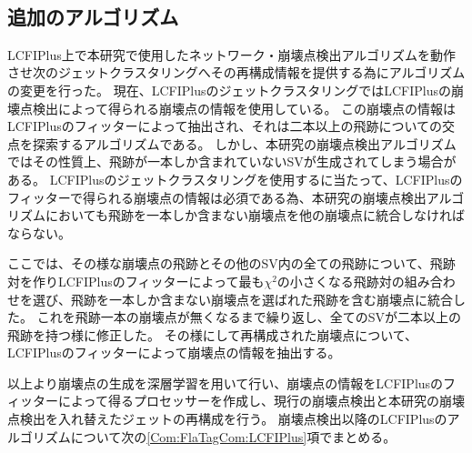 \begin{table}[htb]
 \centering
　\small
  \caption{崩壊点検出のソフトウェア動作環境}
  \label{SoftwareEnvironments}
\end{table}


\subsection{追加のアルゴリズム} \label{Com:FlaTagCom:SingleTrackMerge}

LCFIPlus上で本研究で使用したネットワーク・崩壊点検出アルゴリズムを動作させ次のジェットクラスタリングへその再構成情報を提供する為にアルゴリズムの変更を行った。
現在、LCFIPlusのジェットクラスタリングではLCFIPlusの崩壊点検出によって得られる崩壊点の情報を使用している。
この崩壊点の情報はLCFIPlusのフィッターによって抽出され、それは二本以上の飛跡についての交点を探索するアルゴリズムである。
しかし、本研究の崩壊点検出アルゴリズムではその性質上、飛跡が一本しか含まれていないSVが生成されてしまう場合がある。
LCFIPlusのジェットクラスタリングを使用するに当たって、LCFIPlusのフィッターで得られる崩壊点の情報は必須である為、本研究の崩壊点検出アルゴリズムにおいても飛跡を一本しか含まない崩壊点を他の崩壊点に統合しなければならない。

ここでは、その様な崩壊点の飛跡とその他のSV内の全ての飛跡について、飛跡対を作りLCFIPlusのフィッターによって最も$\chi^2$の小さくなる飛跡対の組み合わせを選び、飛跡を一本しか含まない崩壊点を選ばれた飛跡を含む崩壊点に統合した。
これを飛跡一本の崩壊点が無くなるまで繰り返し、全てのSVが二本以上の飛跡を持つ様に修正した。
その様にして再構成された崩壊点について、LCFIPlusのフィッターによって崩壊点の情報を抽出する。

以上より崩壊点の生成を深層学習を用いて行い、崩壊点の情報をLCFIPlusのフィッターによって得るプロセッサーを作成し、現行の崩壊点検出と本研究の崩壊点検出を入れ替えたジェットの再構成を行う。
崩壊点検出以降のLCFIPlusのアルゴリズムについて次の\ref{Com:FlaTagCom:LCFIPlus}項でまとめる。


